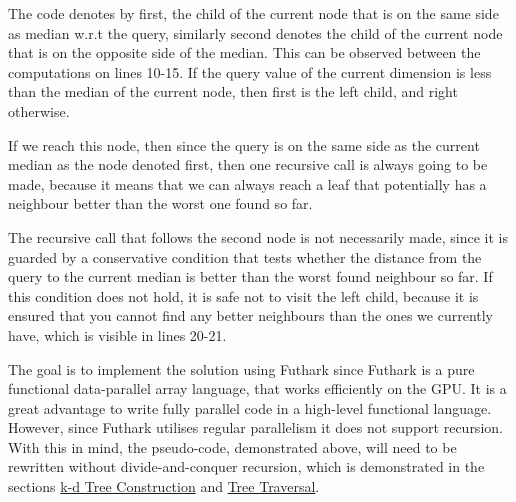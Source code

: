 The code denotes by first, the child of the current node that is on the same side as median w.r.t the query, similarly second denotes the child of the current node that is on the opposite side of the median. This can be observed between the computations on lines 10-15. 
If the query value of the current dimension is less than the median of the current node, then first is the left child, and right otherwise. 

If we reach this node, then since the query is on the same side as the current median as the node denoted first, then one recursive call is always going to be made, because it means that we can always reach a leaf that potentially has a neighbour better than the worst one found so far.

The recursive call that follows the second node is not necessarily made, since it is guarded by a conservative condition that tests whether the distance from the query to the current median is better than the worst found neighbour so far. If this condition does not hold, it is safe not to visit the left child, because it is ensured that you cannot find any better neighbours than the ones we currently have, which is visible in lines 20-21. 


The goal is to implement the solution using Futhark since Futhark is a pure functional data-parallel array language, that works efficiently on the GPU. 
It is a great advantage to write fully parallel code in a high-level functional language. However, since Futhark utilises regular parallelism it does not support recursion. With this in mind, the pseudo-code, demonstrated above, will need to be rewritten without divide-and-conquer recursion, which is demonstrated in the sections \hyperref[sec:kdtree]{k-d Tree Construction} and \hyperref[sec:traversal]{Tree Traversal}.

